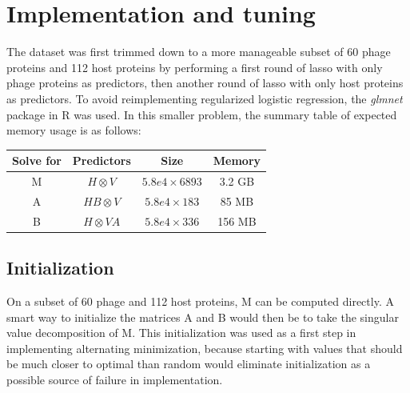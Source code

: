 \documentclass[12pt,twoside]{mitthesis-manusdown}
\begin{document}
\section{Implementation and tuning}\label{implementation-and-tuning}

The dataset was first trimmed down to a more manageable subset of 60
phage proteins and 112 host proteins by performing a first round of
lasso with only phage proteins as predictors, then another round of
lasso with only host proteins as predictors. To avoid reimplementing
regularized logistic regression, the \emph{glmnet} package in R was
used. In this smaller problem, the summary table of expected memory
usage is as follows:
\begin{center}
    \begin{tabular}{ c c c c } 
        \hline
        Solve for & Predictors & Size & Memory \\ 
        \hline
        M & $H \otimes V$ & $5.8e4 \times 6893$ & 3.2 GB \\ 
        A & $HB \otimes V$ & $5.8e4 \times 183$ & 85 MB \\ 
        B & $H \otimes VA$ & $5.8e4 \times 336$ & 156 MB \\ 
        \hline
    \end{tabular}
\end{center}
\vspace{2pt}

\subsection{Initialization}\label{initialization}

On a subset of 60 phage and 112 host proteins, M can be computed
directly. A smart way to initialize the matrices A and B would then be
to take the singular value decomposition of M. This initialization was
used as a first step in implementing alternating minimization, because
starting with values that should be much closer to optimal than random
would eliminate initialization as a possible source of failure in
implementation.
\end{document}
